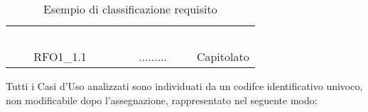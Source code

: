 \begin{table}[h]
	\centering
	\caption{Esempio di classificazione requisito} 
	
\renewcommand{\arraystretch}{1.5}
\begin{tabular}{c c c} 
	
	\rowcolor{darkblue}
	\textcolor{white}{\textbf{Codice Requisito}}&
	\textcolor{white}{\textbf{Descrizione}}&
	\textcolor{white}{\textbf{Fonte}}\\	
	
	RFO1\_1.1 & ......... & Capitolato\\
	
\end{tabular}
\end{table}

Tutti i Casi d'Uso analizzati sono individuati da un codifce identificativo univoco, non modificabile dopo l'assegnazione, rappresentato nel seguente modo:

